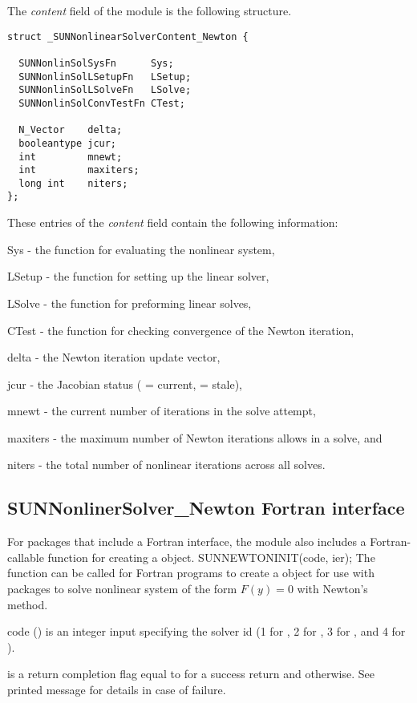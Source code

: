 The \textit{content} field of the {\sunnonlinsolnewton} module is the
following structure.
\begin{verbatim} 
struct _SUNNonlinearSolverContent_Newton {

  SUNNonlinSolSysFn      Sys;
  SUNNonlinSolLSetupFn   LSetup;
  SUNNonlinSolLSolveFn   LSolve;
  SUNNonlinSolConvTestFn CTest;

  N_Vector    delta;
  booleantype jcur;
  int         mnewt;
  int         maxiters;
  long int    niters;
};
\end{verbatim}
These entries of the \emph{content} field contain the following
information:
\begin{args}[maxiters]
  \item[Sys] - the function for evaluating the nonlinear system,
  \item[LSetup] - the function for setting up the linear solver,
  \item[LSolve] - the function for preforming linear solves,
  \item[CTest] - the function for checking convergence of the Newton
    iteration,
  \item[delta] - the Newton iteration update vector,
  \item[jcur] - the Jacobian status ( =
  current,  = stale),
  \item[mnewt] - the current number of iterations in the solve attempt,
  \item[maxiters] - the maximum number of Newton iterations allows in
    a solve, and
  \item[niters] - the total number of nonlinear iterations across all
    solves.
\end{args}


\subsection{SUNNonlinerSolver\_Newton Fortran interface}
\label{ss:sunnonlinsolnewton_fortran}

For {\sundials} packages that include a Fortran interface, the
{\sunnonlinsolnewton} module also includes a Fortran-callable
function for creating a  object.
{
  SUNNEWTONINIT(code, ier);
}
{
  The function  can be called for Fortran programs
  to create a  object for use with {\sundials}
  packages to solve nonlinear system of the form $F(y) = 0$ with
  Newton's method.
}
{
  \begin{args}[code]
  \item[code] ()
    is an integer input specifying the solver id (1 for {\cvode}, 2
    for {\ida}, 3 for {\kinsol}, and 4 for {\arkode}).
  \end{args}
}
{
   is a return completion flag equal to  for a success
  return and  otherwise. See printed message for details in case
  of failure.
}
{}
